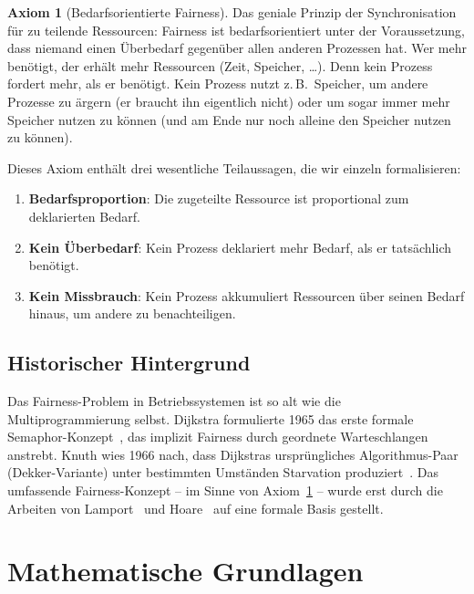 ﻿\documentclass[a4paper,12pt]{article}
\theoremstyle{definition}
\newtheorem{axiom}{Axiom}
\begin{document}
\begin{axiom}[Bedarfsorientierte Fairness]
\label{ax:fairness}
Das geniale Prinzip der Synchronisation für zu teilende Ressourcen:
Fairness ist bedarfsorientiert unter der Voraussetzung, dass niemand
einen Überbedarf gegenüber allen anderen Prozessen hat.
Wer mehr benötigt, der erhält mehr Ressourcen (Zeit, Speicher, \ldots).
Denn kein Prozess fordert mehr, als er benötigt.
Kein Prozess nutzt z.\,B.\ Speicher, um andere Prozesse zu ärgern
(er braucht ihn eigentlich nicht) oder um sogar immer mehr Speicher
nutzen zu können (und am Ende nur noch alleine den Speicher nutzen
zu können).
\end{axiom}

Dieses Axiom enthält drei wesentliche Teilaussagen, die wir einzeln
formalisieren:

\begin{enumerate}
  \item \textbf{Bedarfsproportion}: Die zugeteilte Ressource ist
        proportional zum deklarierten Bedarf.
  \item \textbf{Kein Überbedarf}: Kein Prozess deklariert mehr Bedarf,
        als er tatsächlich benötigt.
  \item \textbf{Kein Missbrauch}: Kein Prozess akkumuliert Ressourcen
        über seinen Bedarf hinaus, um andere zu benachteiligen.
\end{enumerate}

\subsection{Historischer Hintergrund}

Das Fairness-Problem in Betriebssystemen ist so alt wie die
Multiprogrammierung selbst. Dijkstra formulierte 1965 das erste
formale Semaphor-Konzept~\cite{dijkstra1965}, das implizit Fairness
durch geordnete Warteschlangen anstrebt. Knuth wies 1966 nach, dass
Dijkstras ursprüngliches Algorithmus-Paar (Dekker-Variante)
unter bestimmten Umständen Starvation produziert~\cite{knuth1966}.
Das umfassende Fairness-Konzept -- im Sinne von Axiom~\ref{ax:fairness}
-- wurde erst durch die Arbeiten von Lamport~\cite{lamport1974new}
und Hoare~\cite{hoare1974monitors} auf eine formale Basis gestellt.

\section{Mathematische Grundlagen}
\label{sec:grundlagen}
\end{document}
